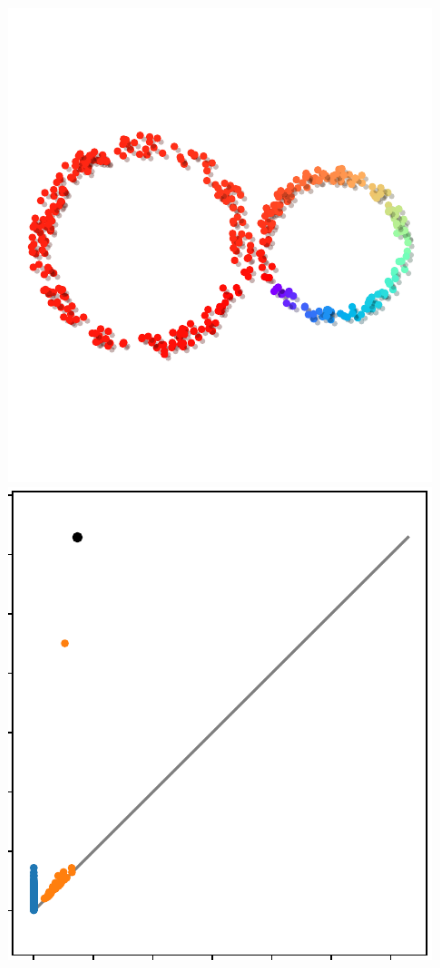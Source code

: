 \begin{figure}[htbp]
  \includegraphics[scale=0.8]{figures/circular_coords2.pdf}\\\vspace{-7ex}
  \includegraphics[scale=0.5]{figures/circular_dgm1.pdf}\hspace{1.3in}

\end{figure}
